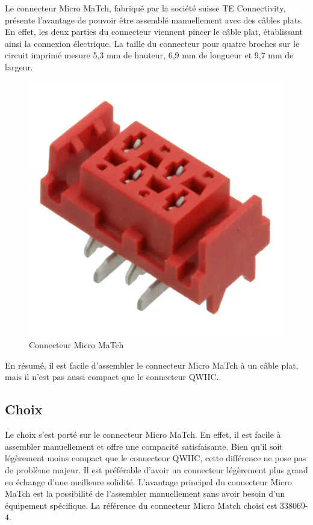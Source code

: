 Le connecteur Micro MaTch, fabriqué par la société suisse TE Connectivity, présente l'avantage de pouvoir être assemblé manuellement avec des câbles plats.
En effet, les deux parties du connecteur viennent pincer le câble plat, établissant ainsi la connexion électrique.
La taille du connecteur pour quatre broches sur le circuit imprimé mesure 5,3 mm de hauteur, 6,9 mm de longueur et 9,7 mm de largeur.

\begin{figure}[H]
    \centering
    \includegraphics[scale=0.08]{./assets/figures/micromatch.png}
    \caption{\cite{micromatch} Connecteur Micro MaTch}
\end{figure}

En résumé, il est facile d'assembler le connecteur Micro MaTch à un câble plat, mais il n'est pas aussi compact que le connecteur QWIIC.

\subsection{Choix}

Le choix s'est porté sur le connecteur Micro MaTch.
En effet, il est facile à assembler manuellement et offre une compacité satisfaisante.
Bien qu'il soit légèrement moins compact que le connecteur QWIIC, cette différence ne pose pas de problème majeur.
Il est préférable d'avoir un connecteur légèrement plus grand en échange d'une meilleure solidité.
L'avantage principal du connecteur Micro MaTch est la possibilité de l'assembler manuellement sans avoir besoin d'un équipement spécifique.
La référence du connecteur Micro Match choisi est 338069-4.

